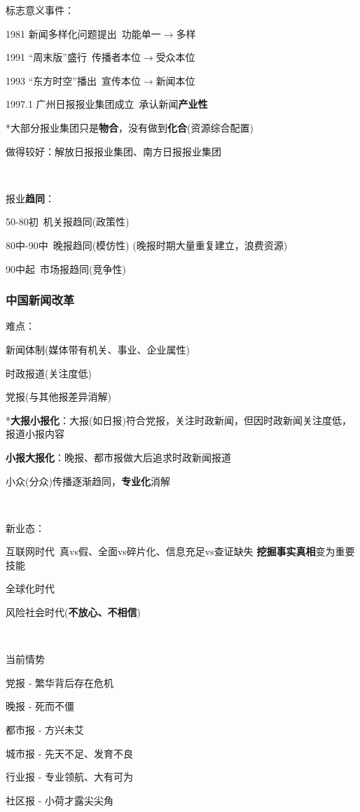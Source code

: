 \documentclass[a4paper,UTF8]{ctexart}
\newcommand{\To}{$\to$}
\begin{document}
标志意义事件：

1981 新闻多样化问题提出\ 功能单一\To 多样

1991 “周末版”盛行\ 传播者本位\To 受众本位

1993 “东方时空”播出\ 宣传本位\To 新闻本位

1997.1 广州日报报业集团成立\ 承认新闻\textbf{产业性}

*大部分报业集团只是\textbf{物合}，没有做到\textbf{化合}(资源综合配置)

做得较好：解放日报报业集团、南方日报报业集团

~

报业\textbf{趋同}：

50-80初\ 机关报趋同(政策性)

80中-90中\ 晚报趋同(模仿性) (晚报时期大量重复建立，浪费资源)

90中起\ 市场报趋同(竞争性)

\subsubsection{中国新闻改革}
难点：

新闻体制(媒体带有机关、事业、企业属性)

时政报道(关注度低)

党报(与其他报差异消解)

*\textbf{大报小报化}：大报(如日报)符合党报，关注时政新闻，但因时政新闻关注度低，报道小报内容

\textbf{小报大报化}：晚报、都市报做大后追求时政新闻报道

小众(分众)传播逐渐趋同，\textbf{专业化}消解

~

新业态：

互联网时代\ 真vs假、全面vs碎片化、信息充足vs查证缺失 \textbf{挖掘事实真相}变为重要技能

全球化时代

风险社会时代(\textbf{不放心、不相信})

~

当前情势

党报 - 繁华背后存在危机

晚报 - 死而不僵

都市报 - 方兴未艾

城市报 - 先天不足、发育不良

行业报 - 专业领航、大有可为

社区报 - 小荷才露尖尖角
\end{document}
